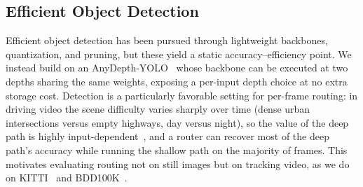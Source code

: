 \subsection{Efficient Object Detection}
\label{sec:related_detection}
Efficient object detection has been pursued through lightweight backbones,
quantization, and pruning, but these yield a static accuracy--efficiency point. 
We instead build on an AnyDepth-YOLO~\cite{kang2026anydepth} whose backbone
can be executed at two depths sharing the same weights, exposing a per-input depth
choice at no extra storage cost. 
Detection is a particularly favorable setting for per-frame routing: in driving video the scene difficulty varies sharply over time (dense urban intersections versus empty highways, day versus night), so the value of the deep path is highly input-dependent~\cite{pixels2027}, and a router can recover most of the deep path's accuracy while running the shallow path on the majority of frames. 
This motivates evaluating routing not on still images but on tracking video, as we do on KITTI~\cite{geiger2012kitti} and BDD100K~\cite{yu2020bdd}.